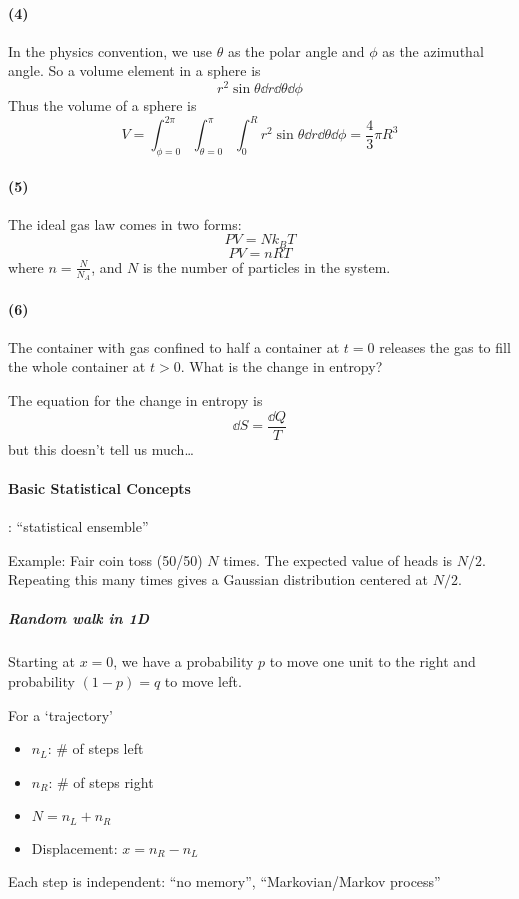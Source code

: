 \documentclass[../main.tex]{subfiles}
\begin{document}
\paragraph*{(4)}
In the physics convention, we use $\theta$ as the polar angle and $\phi$ as the azimuthal angle. So a volume element in a sphere is
\[r^2 \sin\theta \dd r \dd \theta \dd \phi \]
Thus the volume of a sphere is
\[V = \int_{\phi=0}^{2\pi} \int_{\theta = 0}^\pi \int_0^R r^2 \sin\theta \dd r \dd \theta \dd \phi = \frac{4}{3}\pi R^3\]

\paragraph*{(5)}
The ideal gas law comes in two forms:
\[PV = Nk_BT\]
\[PV = nRT\]
where $n = \frac{N}{N_A}$, and $N$ is the number of particles in the system.

\paragraph*{(6)}
The container with gas confined to half a container at $t=0$ releases the gas to fill the whole container at $t>0$.
What is the change in entropy?

The equation for the change in entropy is
\[\dd S = \frac{\dd Q}{T}\]
but this doesn't tell us much\dots

\newpage
\paragraph*{Basic Statistical Concepts}: ``statistical ensemble''

Example: Fair coin toss (50/50) $N$ times. The expected value of heads is $N/2$. Repeating this many times gives a Gaussian distribution centered at $N/2$.

\subparagraph*{Random walk in 1D}

Starting at $x=0$, we have a probability $p$ to move one unit to the right and probability $(1-p)=q$ to move left.

For a `trajectory'
\begin{itemize}
    \item $n_L$: \# of steps left
    \item $n_R$: \# of steps right
    \item $N = n_L + n_R$
    \item Displacement: $x = n_R - n_L$
\end{itemize}
Each step is independent: ``no memory'', ``Markovian/Markov process''
\end{document}
